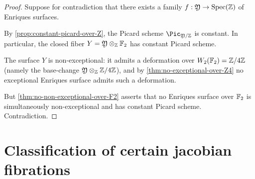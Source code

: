 \begin{proof}
  Suppose for contradiction that there exists a family \(f : \mathfrak{Y} \to \mathrm{Spec}(\mathbb{Z})\) of Enriques surfaces.

  By \cref{prop:constant-picard-over-Z}, the Picard scheme \(\Pic_{\foY/\ZZ}\) is constant.
  In particular, the closed fiber \(Y = \mathfrak{Y} \otimes_{\mathbb{Z}} \mathbb{F}_2\) has constant Picard scheme.

  The surface \(Y\) is non-exceptional: it admits a deformation over \(W_2(\mathbb{F}_2) = \mathbb{Z}/4\mathbb{Z}\)
  (namely the base-change \(\mathfrak{Y} \otimes_{\mathbb{Z}} \mathbb{Z}/4\mathbb{Z}\)), and by \cref{thm:no-exceptional-over-Z4}
  no exceptional Enriques surface admits such a deformation.

  But \cref{thm:no-non-exceptional-over-F2} asserts that no Enriques surface over \(\mathbb{F}_2\)
  is simultaneously non-exceptional and has constant Picard scheme. Contradiction.
\end{proof}

\section{Classification of certain jacobian fibrations}

